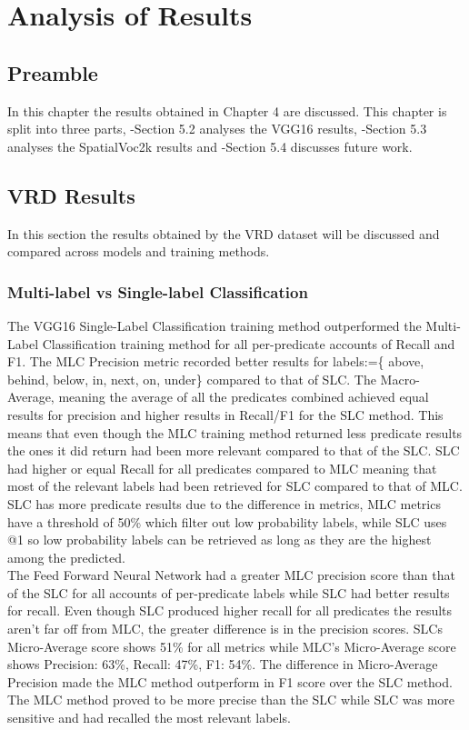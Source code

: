 \documentclass{csfyp}
\newcommand\tab[1][1cm]{\hspace*{#1}}
\begin{document}
\section{Analysis of Results}
\subsection{Preamble}
In this chapter the results obtained in Chapter 4 are discussed. This chapter is split into three parts, -Section 5.2 analyses the VGG16 results, -Section 5.3 analyses the SpatialVoc2k results and -Section 5.4 discusses future work. 

\subsection{VRD Results}
In this section the results obtained by the VRD dataset will be discussed and compared across models and training methods.

\subsubsection{Multi-label vs Single-label Classification}
The VGG16 Single-Label Classification training method outperformed the Multi-Label Classification training method for all per-\Gls{predicate} accounts of Recall and F1. The MLC Precision metric recorded better results for labels:=\{ above, behind, below, in, next, on, under\} compared to that of SLC. The Macro-Average, meaning the average of all the \Gls{predicate}s combined achieved equal results for precision and higher results in Recall/F1 for the SLC method. This means that even though the MLC training method returned less \Gls{predicate} results the ones it did return had been more relevant compared to that of the SLC. SLC had higher or equal Recall for all \Gls{predicate}s compared to MLC meaning that most of the relevant labels had been retrieved for SLC compared to that of MLC. SLC has more \Gls{predicate} results due to the difference in metrics, MLC metrics have a threshold of 50\% which filter out low probability labels, while SLC uses @1 so low probability labels can be retrieved as long as they are the highest among the predicted. 
\\
\tab The Feed Forward Neural Network had a greater MLC precision score than that of the SLC for all accounts of per-\Gls{predicate} labels while SLC had better results for recall. Even though SLC produced higher recall for all \Gls{predicate}s the results aren't far off from MLC, the greater difference is in the precision scores. SLCs Micro-Average score shows 51\% for all metrics while MLC's Micro-Average score shows Precision: 63\%, Recall: 47\%, F1: 54\%. The difference in Micro-Average Precision made the MLC method outperform in F1 score over the SLC method.
\\
The MLC method proved to be more precise than the SLC while SLC was more sensitive and had recalled the most relevant labels.
\end{document}
